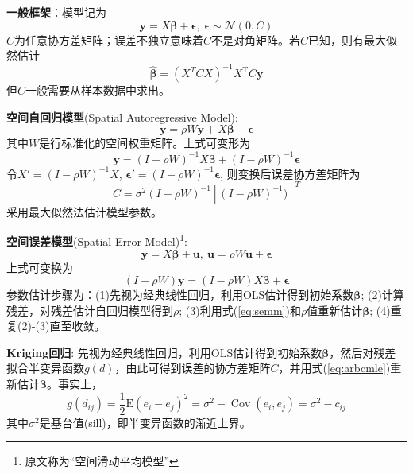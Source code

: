 \par \textbf{一般框架}：模型记为
\begin{equation}
\mathbf{y}=X\boldsymbol{\beta}+\boldsymbol{\epsilon},\ \boldsymbol{\epsilon}\sim \mathcal{N}(0,C)
\end{equation}
$C$为任意协方差矩阵；误差不独立意味着$C$不是对角矩阵。若$C$已知，则有最大似然估计
\begin{equation}
    \hat{\boldsymbol{\beta}}=(X^{T}CX)^{-1}X^{\mathrm{T}} C\mathbf{y}
\label{eq:arbcmle}
\end{equation}
但$C$一般需要从样本数据中求出。

\par \textbf{空间自回归模型}(Spatial Autoregressive Model):
\begin{equation}
\mathbf{y}=\rho W \mathbf{y}+ X\boldsymbol{\beta}+\boldsymbol{\epsilon}
\end{equation}
其中$W$是行标准化的空间权重矩阵。上式可变形为
\begin{equation}
    \mathbf{y}=(I-\rho W)^{-1}X\boldsymbol{\beta}+(I-\rho W)^{-1}\boldsymbol{\epsilon}
\end{equation}
令$X'=(I-\rho W)^{-1}X$, $\boldsymbol{\epsilon}'=(I-\rho W)^{-1}\boldsymbol{\epsilon}$, 则变换后误差协方差矩阵为
\begin{equation}
    C = \sigma^2 (I-\rho W)^{-1}[(I-\rho W)^{-1})]^T
\end{equation}
采用最大似然法估计模型参数。

\par \textbf{空间误差模型}(Spatial Error Model)\footnote{原文称为“空间滑动平均模型”}:
\begin{equation}
\mathbf{y}=X\boldsymbol{\beta}+\mathbf{u},\ \mathbf{u}=\rho W\mathbf{u}+\boldsymbol{\epsilon}
\end{equation}
上式可变换为
\begin{equation}
(I-\rho W)\mathbf{y}=(I-\rho W)X\boldsymbol{\beta}+\boldsymbol{\epsilon}
\label{eq:semm}
\end{equation}
参数估计步骤为：(1)先视为经典线性回归，利用OLS估计得到初始系数$\boldsymbol{\beta}$; (2)计算残差，对残差估计自回归模型得到$\rho$; (3)利用式(\ref{eq:semm})和$\rho$值重新估计$\boldsymbol{\beta}$; (4)重复(2)-(3)直至收敛。

\par \textbf{Kriging回归}: 先视为经典线性回归，利用OLS估计得到初始系数$\boldsymbol{\beta}$，然后对残差拟合半变异函数$g(d)$，由此可得到误差的协方差矩阵$C$，并用式(\ref{eq:arbcmle})重新估计$\boldsymbol{\beta}$。事实上，
\begin{equation}
    g(d_{ij})=\frac{1}{2}\mathrm{E}(e_i-e_j)^2=\sigma^2-\operatorname{Cov}(e_i,e_j)=\sigma^2-c_{ij}
\end{equation}
其中$\sigma^2$是基台值(sill)，即半变异函数的渐近上界。

